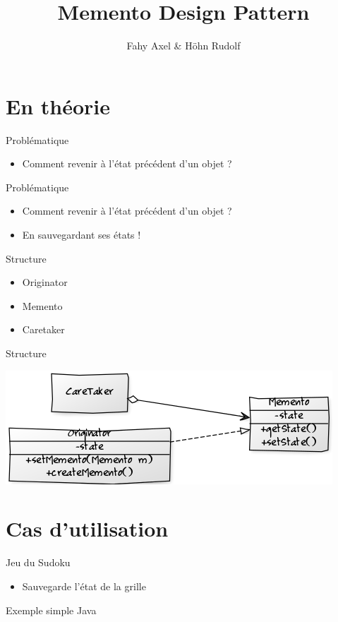 \documentclass[11pt]{beamer}
\author{Fahy Axel \& Höhn Rudolf}
\title{Memento Design Pattern}
\institute{Conception orientée objet\\hepia}
\begin{document}
\begin{frame}
\titlepage
\end{frame}

\section{En théorie}

\begin{frame}{Problématique}
\begin{itemize}
    \item Comment revenir à l'état précédent d'un objet ?
\end{itemize}
\end{frame}

\begin{frame}{Problématique}
\begin{itemize}
    \item Comment revenir à l'état précédent d'un objet ?
    \item En sauvegardant ses états !
\end{itemize}
\end{frame}

\begin{frame}{Structure}
\begin{itemize}
    \item Originator
    \item Memento
    \item Caretaker
\end{itemize}
\end{frame}

\begin{frame}{Structure}
\begin{center}
\includegraphics[scale=0.55]{../memento_classic.png}
\end{center}
\end{frame}

\section{Cas d'utilisation}
\begin{frame}{Jeu du Sudoku}
\begin{itemize}
    \item Sauvegarde l'état de la grille
\end{itemize}
\end{frame}

\begin{frame}{Exemple simple Java}

\end{frame}
\end{document}
